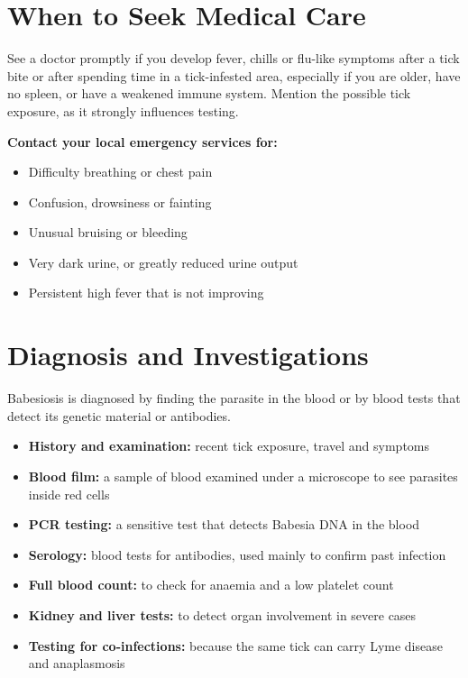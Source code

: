\section*{When to Seek Medical Care}
See a doctor promptly if you develop fever, chills or flu-like symptoms after a tick bite or after spending time in a tick-infested area, especially if you are older, have no spleen, or have a weakened immune system. Mention the possible tick exposure, as it strongly influences testing.

\textbf{Contact your local emergency services for:}
\begin{itemize}
    \item Difficulty breathing or chest pain
    \item Confusion, drowsiness or fainting
    \item Unusual bruising or bleeding
    \item Very dark urine, or greatly reduced urine output
    \item Persistent high fever that is not improving
\end{itemize}

\section*{Diagnosis and Investigations}
Babesiosis is diagnosed by finding the parasite in the blood or by blood tests that detect its genetic material or antibodies.

\begin{itemize}
    \item \textbf{History and examination:} recent tick exposure, travel and symptoms
    \item \textbf{Blood film:} a sample of blood examined under a microscope to see parasites inside red cells
    \item \textbf{PCR testing:} a sensitive test that detects Babesia DNA in the blood
    \item \textbf{Serology:} blood tests for antibodies, used mainly to confirm past infection
    \item \textbf{Full blood count:} to check for anaemia and a low platelet count
    \item \textbf{Kidney and liver tests:} to detect organ involvement in severe cases
    \item \textbf{Testing for co-infections:} because the same tick can carry Lyme disease and anaplasmosis
\end{itemize}


